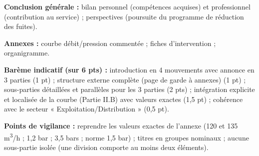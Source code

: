 \documentclass[11pt]{article}
\begin{document}
\begin{corrige}
\textbf{Conclusion générale :} bilan personnel (compétences acquises) et professionnel (contribution au service) ; perspectives (poursuite du programme de réduction des fuites).

\textbf{Annexes :} courbe débit/pression commentée ; fiches d'intervention ; organigramme.

\textbf{Barème indicatif (sur 6 pts) :} introduction en 4 mouvements avec annonce en 3 parties (1 pt) ; structure externe complète (page de garde à annexes) (1 pt) ; sous-parties détaillées et parallèles pour les 3 parties (2 pts) ; intégration explicite et localisée de la courbe (Partie II.B) avec valeurs exactes (1,5 pt) ; cohérence avec le secteur « Exploitation/Distribution » (0,5 pt).

\textbf{Points de vigilance :} reprendre les valeurs exactes de l'annexe (120 et 135 m\textsuperscript{3}/h ; 1,2 bar ; 3,5 bars ; norme 1,5 bar) ; titres en groupes nominaux ; aucune sous-partie isolée (une division comporte au moins deux éléments).
\end{corrige}
\end{document}
